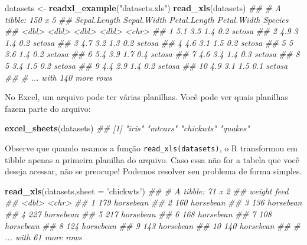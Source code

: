 \documentclass[
]{book}
\newenvironment{Shaded}{\begin{snugshade}}{\end{snugshade}}
\newcommand{\CommentTok}[1]{\textcolor[rgb]{0.56,0.35,0.01}{\textit{#1}}}
\newcommand{\DataTypeTok}[1]{\textcolor[rgb]{0.13,0.29,0.53}{#1}}
\newcommand{\KeywordTok}[1]{\textcolor[rgb]{0.13,0.29,0.53}{\textbf{#1}}}
\newcommand{\NormalTok}[1]{#1}
\newcommand{\StringTok}[1]{\textcolor[rgb]{0.31,0.60,0.02}{#1}}
\begin{document}
\begin{Shaded}
\begin{Highlighting}[]
\NormalTok{datasets <-}\StringTok{ }\KeywordTok{readxl_example}\NormalTok{(}\StringTok{"datasets.xls"}\NormalTok{)}
\KeywordTok{read_xls}\NormalTok{(datasets)}
\CommentTok{## # A tibble: 150 x 5}
\CommentTok{##    Sepal.Length Sepal.Width Petal.Length Petal.Width Species}
\CommentTok{##           <dbl>       <dbl>        <dbl>       <dbl> <chr>  }
\CommentTok{##  1          5.1         3.5          1.4         0.2 setosa }
\CommentTok{##  2          4.9         3            1.4         0.2 setosa }
\CommentTok{##  3          4.7         3.2          1.3         0.2 setosa }
\CommentTok{##  4          4.6         3.1          1.5         0.2 setosa }
\CommentTok{##  5          5           3.6          1.4         0.2 setosa }
\CommentTok{##  6          5.4         3.9          1.7         0.4 setosa }
\CommentTok{##  7          4.6         3.4          1.4         0.3 setosa }
\CommentTok{##  8          5           3.4          1.5         0.2 setosa }
\CommentTok{##  9          4.4         2.9          1.4         0.2 setosa }
\CommentTok{## 10          4.9         3.1          1.5         0.1 setosa }
\CommentTok{## # ... with 140 more rows}
\end{Highlighting}
\end{Shaded}

No Excel, um arquivo pode ter várias planilhas. Você pode ver quais planilhas fazem parte do arquivo:

\begin{Shaded}
\begin{Highlighting}[]
\KeywordTok{excel_sheets}\NormalTok{(datasets)}
\CommentTok{## [1] "iris"     "mtcars"   "chickwts" "quakes"}
\end{Highlighting}
\end{Shaded}

Observe que quando usamos a função \texttt{read\_xls(datasets)}, o R transformou em tibble apenas a primeira planilha do arquivo. Caso essa não for a tabela que você deseja acessar, não se preocupe! Podemos resolver seu problema de forma simples.

\begin{Shaded}
\begin{Highlighting}[]
\KeywordTok{read_xls}\NormalTok{(datasets,}\DataTypeTok{sheet =} \StringTok{'chickwts'}\NormalTok{)}
\CommentTok{## # A tibble: 71 x 2}
\CommentTok{##    weight feed     }
\CommentTok{##     <dbl> <chr>    }
\CommentTok{##  1    179 horsebean}
\CommentTok{##  2    160 horsebean}
\CommentTok{##  3    136 horsebean}
\CommentTok{##  4    227 horsebean}
\CommentTok{##  5    217 horsebean}
\CommentTok{##  6    168 horsebean}
\CommentTok{##  7    108 horsebean}
\CommentTok{##  8    124 horsebean}
\CommentTok{##  9    143 horsebean}
\CommentTok{## 10    140 horsebean}
\CommentTok{## # ... with 61 more rows}
\end{Highlighting}
\end{Shaded}
\end{document}
